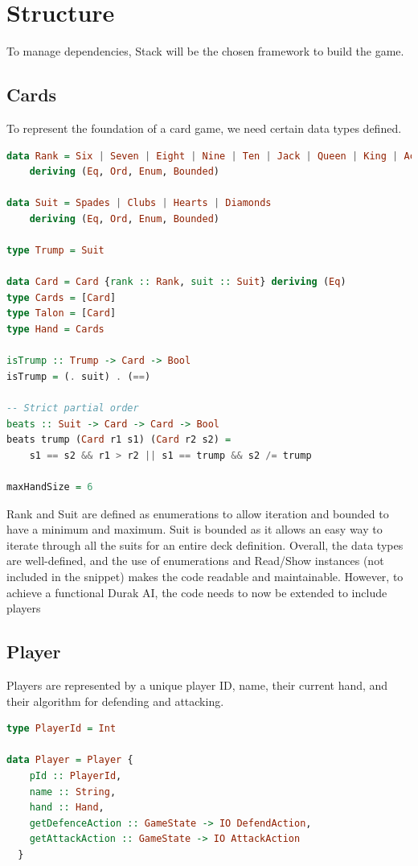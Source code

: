 \documentclass[a4paper, twoside, 12pt]{report}
\begin{document}
\section{Structure}

To manage dependencies, Stack\cite{hstack} will be the chosen framework to build the game.

\subsection{Cards}

To represent the foundation of a card game, we need certain data types defined.

\begin{lstlisting}[language=Haskell]
data Rank = Six | Seven | Eight | Nine | Ten | Jack | Queen | King | Ace
	deriving (Eq, Ord, Enum, Bounded)

data Suit = Spades | Clubs | Hearts | Diamonds
	deriving (Eq, Ord, Enum, Bounded)

type Trump = Suit

data Card = Card {rank :: Rank, suit :: Suit} deriving (Eq)
type Cards = [Card]
type Talon = [Card]
type Hand = Cards

isTrump :: Trump -> Card -> Bool
isTrump = (. suit) . (==)

-- Strict partial order
beats :: Suit -> Card -> Card -> Bool
beats trump (Card r1 s1) (Card r2 s2) =
    s1 == s2 && r1 > r2 || s1 == trump && s2 /= trump

maxHandSize = 6
\end{lstlisting}

Rank and Suit are defined as enumerations to allow iteration and bounded to have a minimum and maximum. Suit is bounded as it allows an easy way to iterate through all the suits for an entire deck definition. Overall, the data types are well-defined, and the use of enumerations and Read/Show instances (not included in the snippet) makes the code readable and maintainable. However, to achieve a functional Durak AI, the code needs to now be extended to include players

\subsection{Player}

Players are represented by a unique player ID, name, their current hand, and their algorithm for defending and attacking.

\begin{lstlisting}[language=Haskell]
type PlayerId = Int

data Player = Player {
    pId :: PlayerId,
    name :: String,
    hand :: Hand,
    getDefenceAction :: GameState -> IO DefendAction,
    getAttackAction :: GameState -> IO AttackAction
  }
\end{lstlisting}
\end{document}
